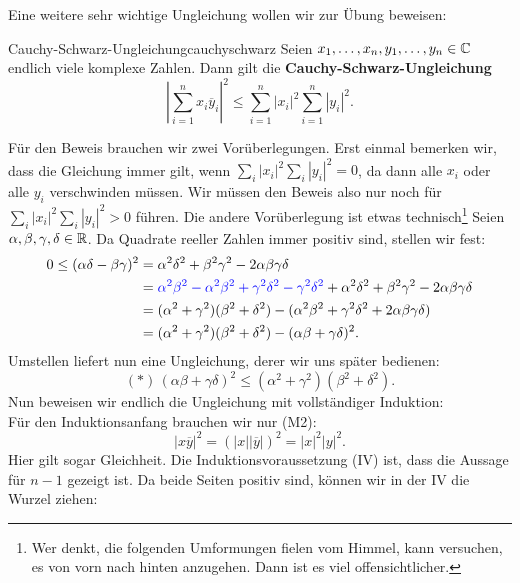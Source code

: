 Eine weitere sehr wichtige Ungleichung wollen wir zur Übung beweisen:
\begin{satz}{Cauchy-Schwarz-Ungleichung}{cauchyschwarz}
Seien $x_1, \dots, x_n, y_1, \dots, y_n \in \mathbb{C}$ endlich viele komplexe Zahlen. Dann gilt die \textbf{Cauchy-Schwarz-Ungleichung}
\begin{equation}
\left| \sum_{i=1}^n x_i \overline{y}_i\right|^2 \leq \sum_{i=1}^n |x_i|^2 \sum_{i=1}^n |y_i|^2.
\end{equation}
\end{satz}
\begin{beweis}
Für den Beweis brauchen wir zwei Vorüberlegungen. Erst einmal bemerken wir, dass die Gleichung immer gilt, wenn $\sum_i |x_i|^2 \sum_i|y_i|^2 = 0$, da dann alle $x_i$ oder alle $y_i$ verschwinden müssen. Wir müssen den Beweis also nur noch für $\sum_i |x_i|^2 \sum_i|y_i|^2 > 0$ führen. Die andere Vorüberlegung ist etwas technisch\footnote{Wer denkt, die folgenden Umformungen fielen vom Himmel, kann versuchen, es von vorn nach hinten anzugehen. Dann ist es viel offensichtlicher.} Seien $\alpha, \beta, \gamma, \delta \in \mathbb{R}$. Da Quadrate reeller Zahlen immer positiv sind, stellen wir fest:
\begin{align*}
0 \leq (\alpha \delta- \beta \gamma)^2 &= \alpha^2\delta^2 + \beta^2 \gamma^2 -2\alpha \beta \gamma \delta\\
&= \textcolor{blue}{\alpha^2 \beta^2 - \alpha^2 \beta^2 + \gamma^2 \delta^2 - \gamma^2 \delta^2} +\alpha^2\delta^2 + \beta^2 \gamma^2 -2\alpha \beta \gamma \delta\\
&= (\alpha^2 + \gamma^2)(\beta^2+\delta^2) - (\alpha^2 \beta^2 + \gamma^2 \delta^2 + 2 \alpha \beta \gamma \delta)\\
&= (\alpha^2 + \gamma^2)(\beta^2+\delta^2) - (\alpha \beta + \gamma \delta)^2.
\end{align*}
Umstellen liefert nun eine Ungleichung, derer wir uns später bedienen:
\begin{equation}
(\ast)\, (\alpha \beta + \gamma \delta)^2 \leq (\alpha^2 + \gamma^2)(\beta^2+\delta^2).
\end{equation}
Nun beweisen wir endlich die Ungleichung mit vollständiger Induktion:\\
Für den Induktionsanfang brauchen wir nur (M2):
\begin{equation}
|x\overline{y}|^2 = (|x||\overline{y}|)^2 = |x|^2|y|^2.
\end{equation}
Hier gilt sogar Gleichheit. Die Induktionsvoraussetzung (IV) ist, dass die Aussage für $n-1$ gezeigt ist. Da beide Seiten positiv sind, können wir in der IV die Wurzel ziehen:

\end{beweis}

